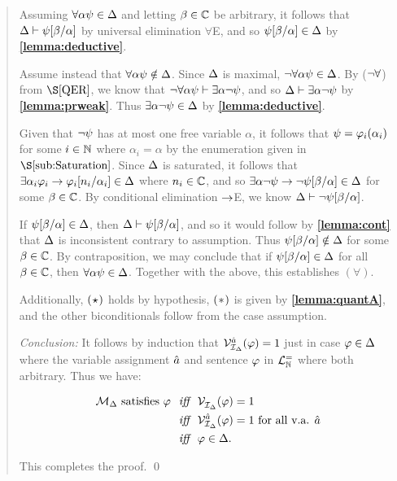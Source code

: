 \begin{quote}
  Assuming $\forall \alpha\psi \in \Delta$ and letting $\beta \in \mathbb{C}$ be arbitrary, it follows that $\Delta \vdash \psi[\beta/\alpha]$ by universal elimination $\forall$E, and so $\psi[\beta/\alpha] \in \Delta$ by \textbf{\ref{lemma:deductive}}. 

  Assume instead that $\forall \alpha\psi \notin \Delta$.
  Since $\Delta$ is maximal, $\neg\forall \alpha\psi \in \Delta$.
  By ($\neg\forall$) from $\S\ref{QER}$, we know that $\neg\forall \alpha\psi \vdash \exists \alpha\neg\psi$, and so $\Delta \vdash \exists \alpha\neg\psi$ by \textbf{\ref{lemma:prweak}}.
  Thus $\exists \alpha\neg\psi \in \Delta$ by \textbf{\ref{lemma:deductive}}.

  Given that $\neg\psi$ has at most one free variable $\alpha$, it follows that $\psi=\varphi_i(\alpha_i)$ for some $i\in\mathbb{N}$ where $\alpha_i=\alpha$ by the enumeration given in $\S\ref{sub:Saturation}$.
  Since $\Delta$ is saturated, it follows that $\exists \alpha_i \varphi_i \rightarrow \varphi_i[n_i/\alpha_i] \in \Delta$ where $n_i\in\mathbb{C}$, and so $\exists \alpha\neg\psi \rightarrow \neg\psi[\beta/\alpha] \in  \Delta$ for some $\beta \in \mathbb{C}$.
  By conditional elimination $\rightarrow$E, we know $\Delta \vdash \neg\psi[\beta/\alpha]$.

  If $\psi[\beta/\alpha] \in \Delta$, then $\Delta \vdash \psi[\beta/\alpha]$, and so it would follow by \textbf{\ref{lemma:cont}} that $\Delta$ is inconsistent contrary to assumption. 
  Thus $\psi[\beta/\alpha] \notin \Delta$ for some $\beta \in \mathbb{C}$.
  By contraposition, we may conclude that if $\psi[\beta/\alpha] \in \Delta$ for all $\beta \in \mathbb{C}$, then $\forall \alpha\psi \in \Delta$.
  Together with the above, this establishes $(\forall)$. 

  Additionally, $(\hspace{.7pt}\star\hspace{.7pt})$ holds by hypothesis, $(\hspace{.7pt}\ast\hspace{.7pt})$ is given by \textbf{\ref{lemma:quantA}}, and the other biconditionals follow from the case assumption.

  \textit{Conclusion:}
  It follows by induction that $\mathcal{V}_{\mathcal{I}_{\Delta}}^{\hat{a}}(\varphi)=1$ just in case $\varphi\in\Delta$ where the variable assignment $\hat{a}$ and sentence $\varphi$ in $\mathcal{L}^{=}_{\mathbb{N}}$ where both arbitrary. 
  Thus we have:

  \vspace{-.2in}
  \begin{align*}
    \mathcal{M}_{\Delta} \text{ satisfies } \varphi &\textit{ ~iff~ } \mathcal{V}_{\mathcal{I}_{\Delta}}^{}(\varphi)=1\\
    &\textit{ ~iff~ } \mathcal{V}_{\mathcal{I}_{\Delta}}^{\hat{a}}(\varphi)=1 \text{ for all v.a. } \hat{a}\\
      &\textit{ ~iff~ } \varphi\in\Delta.
  \end{align*}

  This completes the proof.
  \qed
\end{quote}

